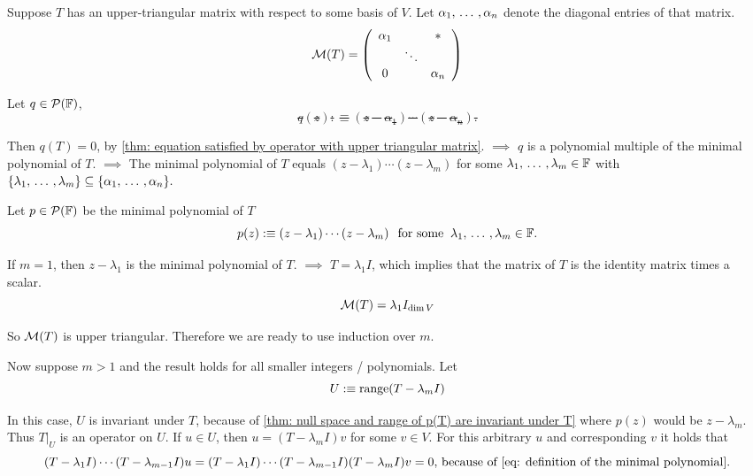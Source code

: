 \begin{prf}
   Suppose $T$ has an upper-triangular matrix with respect to some basis of $V$. Let $\alpha_1, {\, \ldots \,\,}, \alpha_n$ denote the diagonal entries of that matrix.
  \begin{equation}
  \mmatrix(T) =
  \left( {\begin{array}{ccc}
      \alpha_1 &         &  \mathlarger{*} \\
      &  \ddots &    \\
      0      &         & \alpha_n
  \end{array} } \right)
  \end{equation}

  Let $q\in \mathcal{P}(\mathbb{F})$, \st
  \begin{equation}
    q(z) :\equiv (z-\alpha_1) \cdots (z-\alpha_n).
  \end{equation}

  Then $q(T) = 0$, by \ref{thm: equation satisfied by operator with upper triangular matrix}. $\implies$ $q$ is a polynomial multiple of the minimal polynomial of $T$. $\implies$ The minimal polynomial of $T$ equals $(z-\lambda_1) \cdots (z-\lambda_m)$ for some $\lambda_1, {\, \ldots \,\,}, \lambda_m \in \mathbb{F}$ with $\{ \lambda_1 , {\, \ldots \,\,}, \lambda_m \} \subseteq \{\alpha_1, {\, \ldots \,\,}, \alpha_n \}.$

   Let $p \in \mathcal{P}(\mathbb{F})$ be the minimal polynomial of $T$ \st
  \begin{equation}
    \label{eq: definition of the minimal polynomial}
    p(z) :\equiv (z-\lambda_1) \cdots (z-\lambda_m) \;\;\, \text{for some}\;\; \lambda_1, {\, \ldots \,\,}, \lambda_m \in \mathbb{F}.
  \end{equation}

  If $m=1$, then $z-\lambda_1$ is the minimal polynomial of $T$. $\implies$ $T=\lambda_1I$, which implies that the matrix of $T$ is the identity matrix times a scalar.
  \begin{equation}
    \mathcal{M}(T) = \lambda_1 I_{\dim V}
  \end{equation}

  So $\mathcal{M}(T)$ is upper triangular. Therefore we are ready to use induction over $m$.

  Now suppose $m > 1$ and the result holds for all smaller integers /  polynomials. Let
  \begin{equation}
    U :\equiv \operatorname{range}(T - \lambda_m I)
  \end{equation}

  In this case, $U$ is invariant under $T$, because of \ref{thm: null space and range of p(T) are invariant under T} where $p(z)$ would be $z-\lambda_m$. Thus $\left. T \right |_{U}$ is an operator on $U$.
  If $u \in U$, then $u=(T - \lambda_m I) v$ for some $v \in V$. For this arbitrary $u$ and corresponding $v$ it holds that
  \begin{equation}
    (T-\lambda_1 I) \cdots (T-\lambda_{m-1}I)u=(T-\lambda_1I)\cdots(T-\lambda_{m-1}I)(T-\lambda_mI)v=0, $ because of \eqref{eq: definition of the minimal polynomial}.$
  \end{equation}


\end{prf}
